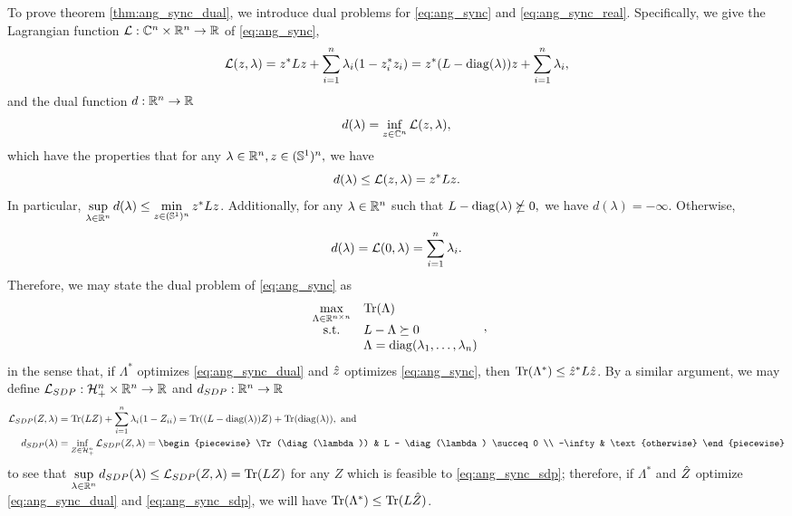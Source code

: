 To prove theorem \ref{thm:ang_sync_dual}, we introduce dual problems for \eqref{eq:ang_sync} and \eqref{eq:ang_sync_real}.  Specifically, we give the Lagrangian function $\mathcal{L} : \mathbb{C}^n \times \mathbb{R}^n \to \mathbb{R}$ of \eqref{eq:ang_sync}, \[\mathcal{L}(z, \lambda) = z^* L z + \sum_{i = 1}^n \lambda_i (1 - z_i^* z_i) = z^*(L - \operatorname{diag}(\lambda)) z + \sum_{i = 1}^n \lambda_i,\] and the dual function $d : \mathbb{R}^n \to \mathbb{R}$ \[d(\lambda) = \inf_{z \in \mathbb{C}^n} \mathcal{L}(z, \lambda),\] which have the properties that for any $\lambda \in \mathbb{R}^n, z \in (\mathbb{S}^1)^n,$ we have \[d(\lambda) \le \mathcal{L}(z, \lambda) = z^* L z.\]  In particular, $\sup\limits_{\lambda \in \mathbb{R}^n} d(\lambda) \le \min\limits_{z \in (\mathbb{S}^1)^n} z^* L z$.  Additionally, for any $\lambda \in \mathbb{R}^n$ such that $L - \operatorname{diag}(\lambda) \nsucceq 0,$ we have $d(\lambda) = - \infty$.  Otherwise, \[d(\lambda) = \mathcal{L}(0, \lambda) = \sum_{i = 1}^n \lambda_i.\]  Therefore, we may state the dual problem of \eqref{eq:ang_sync} as
\begin{equation}
  \begin{array}{cl} \max\limits_{\Lambda \in \mathbb{R}^{n \times n}} & \operatorname{Tr}(\Lambda) \\
    \text{s.t.} & L - \Lambda \succeq 0 \\
    & \Lambda = \operatorname{diag}(\lambda_1, \ldots, \lambda_n)
  \end{array}, \label{eq:ang_sync_dual}
\end{equation}
in the sense that, if $\Lambda^*$ optimizes \eqref{eq:ang_sync_dual} and $\hat{z}$ optimizes \eqref{eq:ang_sync}, then $\operatorname{Tr}(\Lambda^*) \le \hat{z}^* L \hat{z}$.  By a similar argument, we may define $\mathcal{L}_{SDP} : \mathcal{H}_+^n \times \mathbb{R}^n \to \mathbb{R}$ and $d_{SDP} : \mathbb{R}^n \to \mathbb{R}$
\begin{align*}
  \Lc_{SDP}(Z, \lambda) &= \Tr(LZ) + \sum_{i = 1}^n \lambda_i(1 - Z_{ii}) = \Tr((L - \diag(\lambda)) Z) + \Tr(\diag(\lambda)), \ \text{and} \\
  d_{SDP}(\lambda) &= \inf_{Z \in \H^n_+} \Lc_{SDP}(Z, \lambda) = \begin{piecewise} \Tr(\diag(\lambda)) & L - \diag(\lambda) \succeq 0 \\ -\infty & \text{otherwise} \end{piecewise}
\end{align*}
to see that $\sup\limits_{\lambda \in \mathbb{R}^n} d_{SDP}(\lambda) \le \mathcal{L}_{SDP}(Z, \lambda) = \operatorname{Tr}(LZ)$ for any $Z$ which is feasible to \eqref{eq:ang_sync_sdp}; therefore, if $\Lambda^*$ and $\hat{Z}$ optimize \eqref{eq:ang_sync_dual} and \eqref{eq:ang_sync_sdp}, we will have $\operatorname{Tr}(\Lambda^*) \le \operatorname{Tr}(L\hat{Z})$.

